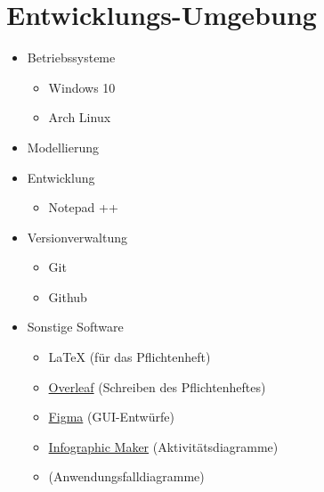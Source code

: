 \section{Entwicklungs-Umgebung}
        \begin{itemize}[noitemsep]
            \item Betriebssysteme 
                \begin{itemize}[noitemsep]
                    \item Windows 10
                    \item Arch Linux
                \end{itemize}
            \item Modellierung %
            \item Entwicklung %
            \begin{itemize}[noitemsep]
                \item Notepad ++
            \end{itemize}
            \item Versionverwaltung
                \begin{itemize}[noitemsep]
                    \item Git
                    \item Github
                \end{itemize}
            \item Sonstige Software
                \begin{itemize}[noitemsep]
                    \item \LaTeX \hspace{0.1cm} (für das Pflichtenheft)
                    \item \href{https://de.overleaf.com}{Overleaf} (Schreiben des Pflichtenheftes)
                    \item \href{https://www.figma.com}{Figma} (GUI-Entwürfe)
                    \item \href{https://online.visual-paradigm.com/}{Infographic Maker} (Aktivitätsdiagramme)
                    \item \href{https://app.diagrams.net/}{} (Anwendungsfalldiagramme)
                \end{itemize}
        \end{itemize}   